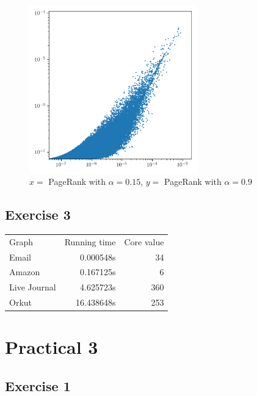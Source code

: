 \documentclass{article}
\begin{document}
\begin{figure}[H]
    \centering
    \includegraphics[width=0.65\textwidth]{plots/6.png}
    \caption{$x =$ PageRank with $\alpha = 0.15$, $y = $ PageRank with $\alpha = 0.9$}
    \label{fig:6}
\end{figure}

\subsection*{Exercise 3}%
\label{sub:tp2ex3}
\begin{table}[!ht]
    \centering
    \begin{tabular}{lrr}
        Graph & Running time & Core value\\
        Email&
        0.000548s&
        34\\
        Amazon&
        0.167125s&
        6\\
        Live Journal&
        4.625723s&
        360\\
        Orkut&
        16.438648s&
        253
    \end{tabular}
\end{table}

\section*{Practical 3}%
\label{sec:tp3}
\subsection*{Exercise 1}
\end{document}

